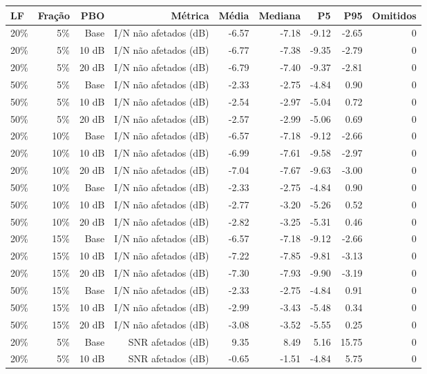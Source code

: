 \begin{tabular}{lrrrrrrrr}
\toprule
LF & Fração & PBO & Métrica & Média & Mediana & P5 & P95 & Omitidos \\
\midrule
20\% & 5\% & Base & I/N não afetados (dB) & -6.57 & -7.18 & -9.12 & -2.65 & 0 \\
20\% & 5\% & 10 dB & I/N não afetados (dB) & -6.77 & -7.38 & -9.35 & -2.79 & 0 \\
20\% & 5\% & 20 dB & I/N não afetados (dB) & -6.79 & -7.40 & -9.37 & -2.81 & 0 \\
50\% & 5\% & Base & I/N não afetados (dB) & -2.33 & -2.75 & -4.84 & 0.90 & 0 \\
50\% & 5\% & 10 dB & I/N não afetados (dB) & -2.54 & -2.97 & -5.04 & 0.72 & 0 \\
50\% & 5\% & 20 dB & I/N não afetados (dB) & -2.57 & -2.99 & -5.06 & 0.69 & 0 \\
20\% & 10\% & Base & I/N não afetados (dB) & -6.57 & -7.18 & -9.12 & -2.66 & 0 \\
20\% & 10\% & 10 dB & I/N não afetados (dB) & -6.99 & -7.61 & -9.58 & -2.97 & 0 \\
20\% & 10\% & 20 dB & I/N não afetados (dB) & -7.04 & -7.67 & -9.63 & -3.00 & 0 \\
50\% & 10\% & Base & I/N não afetados (dB) & -2.33 & -2.75 & -4.84 & 0.90 & 0 \\
50\% & 10\% & 10 dB & I/N não afetados (dB) & -2.77 & -3.20 & -5.26 & 0.52 & 0 \\
50\% & 10\% & 20 dB & I/N não afetados (dB) & -2.82 & -3.25 & -5.31 & 0.46 & 0 \\
20\% & 15\% & Base & I/N não afetados (dB) & -6.57 & -7.18 & -9.12 & -2.66 & 0 \\
20\% & 15\% & 10 dB & I/N não afetados (dB) & -7.22 & -7.85 & -9.81 & -3.13 & 0 \\
20\% & 15\% & 20 dB & I/N não afetados (dB) & -7.30 & -7.93 & -9.90 & -3.19 & 0 \\
50\% & 15\% & Base & I/N não afetados (dB) & -2.33 & -2.75 & -4.84 & 0.91 & 0 \\
50\% & 15\% & 10 dB & I/N não afetados (dB) & -2.99 & -3.43 & -5.48 & 0.34 & 0 \\
50\% & 15\% & 20 dB & I/N não afetados (dB) & -3.08 & -3.52 & -5.55 & 0.25 & 0 \\
20\% & 5\% & Base & SNR afetados (dB) & 9.35 & 8.49 & 5.16 & 15.75 & 0 \\
20\% & 5\% & 10 dB & SNR afetados (dB) & -0.65 & -1.51 & -4.84 & 5.75 & 0 \\

\end{tabular}
